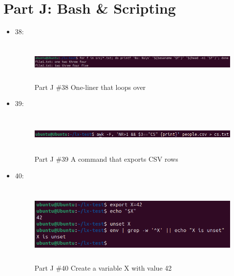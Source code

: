 \section{Part J: Bash \& Scripting}
\begin{itemize}
    \item 38: 
     \begin{figure}[H]
        \centering
        \includegraphics[width=12cm, height=2cm]{png/LinuxProblemSetPicsPNG/PartI38.png}
        \caption{Part J \#38 One-liner that loops over}
        \label{fig:partJ 38}
    \end{figure}
    \item 39: 
     \begin{figure}[H]
        \centering
        \includegraphics[width=15cm, height=2cm]{png/LinuxProblemSetPicsPNG/PartI39.png}
        \caption{Part J \#39 A command that exports CSV rows}
        \label{fig:partJ 39}
    \end{figure}
    \item 40: 
     \begin{figure}[H]
        \centering
        \includegraphics[width=15cm, height=4cm]{png/LinuxProblemSetPicsPNG/PartI40.png}
        \caption{Part J \#40 Create a variable X with value 42}
        \label{fig:partJ 40}
    \end{figure}
\end{itemize}

